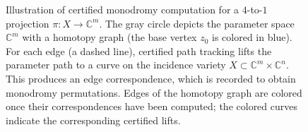 \documentclass[11pt]{amsart}
\theoremstyle{definition}
\theoremstyle{remark}
\begin{document}
\begin{figure}
\caption{Illustration of certified monodromy computation for a $4$-to-$1$ projection $\pi:X\to\mathbb{C}^m$. The gray circle depicts the parameter space $\mathbb{C}^m$ with a homotopy graph (the base vertex $z_0$ is colored in blue). For each edge (a dashed line), certified path tracking lifts the parameter path to a curve on the incidence variety $X\subset \mathbb{C}^m\times\mathbb{C}^n$. This produces an edge correspondence, which is recorded to obtain monodromy permutations. Edges of the homotopy graph are colored once their correspondences have been computed; the colored curves indicate the corresponding certified lifts.}
    \label{fig:main-figure}
\end{figure}
\end{document}
